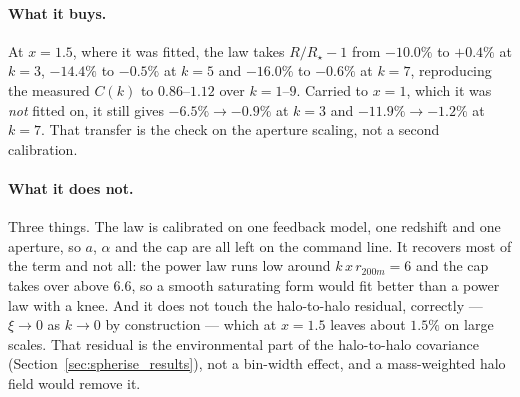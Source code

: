 \documentclass{article}
\begin{document}
\paragraph{What it buys.} At $x = 1.5$, where it was fitted, the law takes
$R/R_\star - 1$ from $-10.0\%$ to $+0.4\%$ at $k = 3$, $-14.4\%$ to $-0.5\%$ at
$k=5$ and $-16.0\%$ to $-0.6\%$ at $k=7$, reproducing the measured $C(k)$ to
$0.86$--$1.12$ over $k = 1$--$9$. Carried to $x = 1$, which it was \emph{not}
fitted on, it still gives $-6.5\%\to-0.9\%$ at $k=3$ and
$-11.9\%\to-1.2\%$ at $k=7$. That transfer is the check on the aperture
scaling, not a second calibration.

\paragraph{What it does not.} Three things. The law is calibrated on one
feedback model, one redshift and one aperture, so $a$, $\alpha$ and the cap are
all left on the command line. It recovers most of the term and not all: the
power law runs low around $k\,x\,r_{200m} = 6$ and the cap takes over above
$6.6$, so a smooth saturating form would fit better than a power law with a
knee. And it does not touch the halo-to-halo residual, correctly --- $\xi\to0$
as $k\to0$ by construction --- which at $x = 1.5$ leaves about $1.5\%$ on large
scales. That residual is the environmental part of the halo-to-halo covariance
(Section~\ref{sec:spherise_results}), not a bin-width effect, and a
mass-weighted halo field would remove it.
\end{document}

